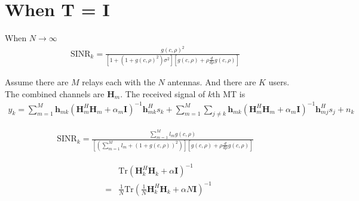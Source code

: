 \documentclass[12pt,journal,draftclsnofoot,onecolumn]{IEEEtran}
\begin{document}
\section{When T = I }
When $N \to \infty$
\begin{eqnarray}
\mathrm{SINR}_k = \frac{g(c,\rho)^2}{\left[1 + (1 + g(c,\rho)^2)\sigma^2\right]\left[g(c,\rho) + \rho\frac{d}{d\rho}g(c,\rho)\right]}
\end{eqnarray}

Assume there are $M$ relays each with the $N$ antennas. And there are $K$ users. The combined channels are $\mathbf{H}_m$. The received signal of $k$th MT is
\begin{eqnarray}
y_k = \sum_{m = 1}^{M}\mathbf{h}_{mk}\left(\mathbf{H}_m^H\mathbf{H}_m + \alpha_m\mathbf{I}\right)^{-1}\mathbf{h}_{mk}^Hs_k + \sum_{m=1}^{M}\sum_{j \neq k}\mathbf{h}_{mk}\left(\mathbf{H}_m^H\mathbf{H}_m + \alpha_m\mathbf{I}\right)^{-1}\mathbf{h}_{mj}^H s_j + n_k
\end{eqnarray}

\begin{eqnarray}
\mathrm{SINR}_k = \frac{\sum_{m = 1}^{M}l_mg(c,\rho)}{\left[\left(\sum_{m = 1}^{M}l_m + (1 + g(c,\rho))^2\right)\right]\left[g(c,\rho) + \rho\frac{d}{d\rho}g(c,\rho)\right]}
\end{eqnarray}


\begin{eqnarray}
&&\mathrm{Tr}\left(\mathbf{H}_k^H\mathbf{H}_k + \alpha\mathbf{I}\right)^{-1}\\
&=&\frac{1}{N}\mathrm{Tr}\left(\frac{1}{N}\mathbf{H}_k^H\mathbf{H}_k + \alpha N\mathbf{I}\right)^{-1} 
\end{eqnarray}
\end{document}
